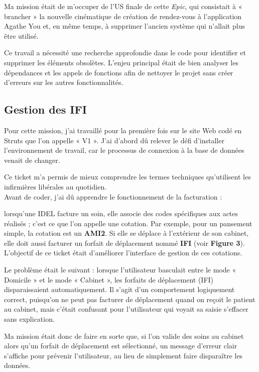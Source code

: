 \documentclass{article}
\begin{document}
Ma mission était de m'occuper de l'US finale de cette \textit{Epic}, qui consistait à « brancher » la nouvelle cinématique de création de rendez-vous à l'application Agathe You et, en même temps, à supprimer l'ancien système qui n'allait plus être utilisé.

Ce travail a nécessité une recherche approfondie dans le code pour identifier et supprimer les éléments obsolètes. L'enjeu principal était de bien analyser les dépendances et les appels de fonctions afin de nettoyer le projet sans créer d'erreurs sur les autres fonctionnalités.

\newpage

\subsection{Gestion des IFI}

Pour cette mission, j'ai travaillé pour la première fois sur le site Web codé en Struts que l'on appelle « V1 ». J'ai d'abord dû relever le défi d'installer l'environnement de travail, car le processus de connexion à la base de données venait de changer.

Ce ticket m'a permis de mieux comprendre les termes techniques qu'utilisent les infirmières libérales au quotidien.\\

Avant de coder, j'ai dû apprendre le fonctionnement de la facturation :

lorsqu'une IDEL facture un soin, elle associe des codes spécifiques aux actes réalisés ; c'est ce que l'on appelle une cotation. Par exemple, pour un pansement simple, la cotation est un \textbf{AMI2}. Si elle se déplace à l'extérieur de son cabinet, elle doit aussi facturer un forfait de déplacement nommé \textbf{IFI} (voir \textbf{Figure 3}).\\

L'objectif de ce ticket était d'améliorer l'interface de gestion de ces cotations.

Le problème était le suivant : lorsque l'utilisateur basculait entre le mode « Domicile » et le mode « Cabinet », les forfaits de déplacement (IFI) disparaissaient automatiquement. Il s'agit d'un comportement logiquement correct, puisqu'on ne peut pas facturer de déplacement quand on reçoit le patient au cabinet, mais c'était confusant pour l'utilisateur qui voyait sa saisie s'effacer sans explication.

Ma mission était donc de faire en sorte que, si l'on valide des soins au cabinet alors qu'un forfait de déplacement est sélectionné, un message d'erreur clair s'affiche pour prévenir l'utilisateur, au lieu de simplement faire disparaître les données.
\end{document}
